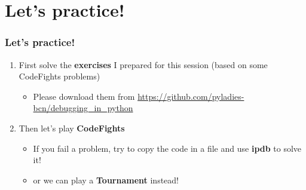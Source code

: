 \section{Let's practice!}
\begin{frame}
\frametitle{Let's practice!}	

\begin{enumerate}
    \item First solve the \textbf{exercises} I prepared for this session (based on some CodeFights problems)
        \begin{itemize}
            \item Please download them from \url{https://github.com/pyladies-bcn/debugging_in_python}
        \end{itemize}
    \item Then let's play \textbf{CodeFights}
        \begin{itemize}
            \item If you fail a problem, try to copy the code in a file and use \textbf{ipdb} to solve it!
            \item or we can play a \textbf{Tournament} instead!
        \end{itemize}
\end{enumerate}

\end{frame}



\ThankYouFrame

